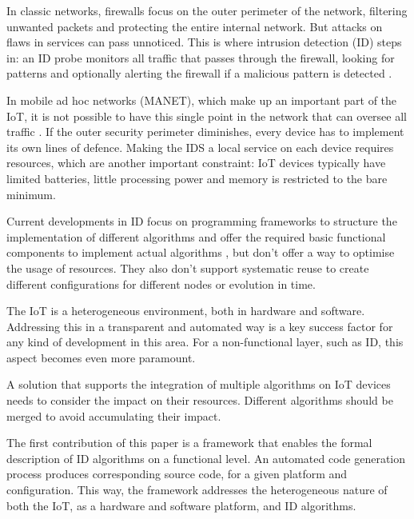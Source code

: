 \documentclass[conference]{IEEEtran}
\begin{document}

In classic networks, firewalls focus on the outer perimeter of the network,
filtering unwanted packets and protecting the entire internal network. But
attacks on flaws in services can pass unnoticed. This is where intrusion
detection (ID) steps in: an ID probe monitors all traffic that passes through
the firewall, looking for patterns and optionally alerting the firewall if a
malicious pattern is detected \cite{denning1987intrusion}.


In mobile ad hoc networks (MANET), which make up an important part of the IoT,
it is not possible to have this single point in the network that can oversee
all traffic \cite{zhang2000intrusion, mishra2004intrusion}. If the outer
security perimeter diminishes, every device has to implement its own lines of
defence. Making the IDS a local service on each device requires resources,
which are another important constraint: IoT devices typically have limited
batteries, little processing power and memory is restricted to the bare minimum.


Current developments in ID focus on programming frameworks to structure the
implementation of different algorithms \cite{valero2012di} and offer the
required basic functional components to implement actual algorithms
\cite{krontiris2008lidea}, but don't offer a way to optimise the usage of
resources. They also don't support systematic reuse to create different
configurations for different nodes or evolution in time.


The IoT is a heterogeneous environment, both in hardware and software.
Addressing this in a transparent and automated way is a key success factor for
any kind of development in this area. For a non-functional layer, such as ID,
this aspect becomes even more paramount.

A solution that supports the integration of multiple algorithms on IoT devices
needs to consider the impact on their resources. Different algorithms should be
merged to avoid accumulating their impact.



The first contribution of this paper is a framework that enables the formal
description of ID algorithms on a functional level. An automated code
generation process produces corresponding source code, for a given platform and
configuration. This way, the framework addresses the heterogeneous nature of
both the IoT, as a hardware and software platform, and ID algorithms.
\end{document}
